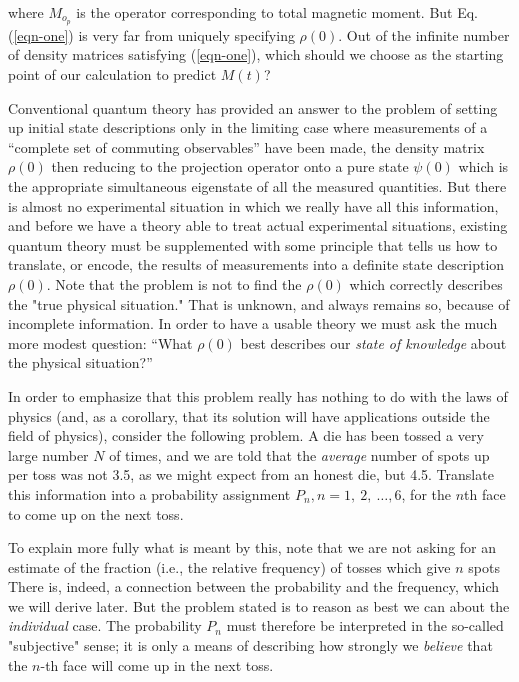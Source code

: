 \documentclass[]{article}
\begin{document}
where \(M_{o_p}\) is the operator corresponding to total magnetic moment. But Eq. (\ref{eqn-one}) is very far from uniquely
specifying \(\rho(0)\). Out of the infinite number of density matrices
satisfying (\ref{eqn-one}), which should we choose as the starting point of our
calculation to predict \(M(t)\)?

Conventional quantum theory has provided an answer to the problem of
setting up initial state descriptions only in the limiting case where
measurements of a ``complete set of commuting observables'' have been
made, the density matrix \(\rho(0)\) then reducing to the projection
operator onto a pure state \(\psi(0)\) which is the appropriate
simultaneous eigenstate of all the measured quantities. But there is
almost no experimental situation in which we really have all this
information, and before we have a theory able to treat actual
experimental situations, existing quantum theory must be supplemented
with some principle that tells us how to translate, or encode, the
results of measurements into a definite state description \(\rho(0)\).
Note that the problem is not to find the \(\rho(0)\) which correctly
describes the "true physical situation." That is unknown, and always
remains so, because of incomplete information. In order to have a usable
theory we must ask the much more modest question: ``What \(\rho(0)\) best
describes our \emph{state of knowledge} about the physical situation?''

In order to emphasize that this problem really has nothing to do with
the laws of physics (and, as a corollary, that its solution will have
applications outside the field of physics), consider the following
problem. A die has been tossed a very large number \(N\) of times, and
we are told that the \emph{average} number of spots up per toss was not
3.5, as we might expect from an honest die, but 4.5. Translate this
information into a probability assignment
\(P_{n},n = 1,\ 2,\ \ldots,6\), for the \(n\)th face to come up on the
next toss.

To explain more fully what is meant by this, note that we are not asking
for an estimate of the fraction (i.e., the relative frequency) of tosses
which give \(n\) spots There is, indeed, a connection between the
probability and the frequency, which we will derive later. But the
problem stated is to reason as best we can about the \emph{individual}
case. The probability \(P_{n}\) must therefore be interpreted in the
so-called "subjective" sense; it is only a means of describing how
strongly we \emph{believe} that the \(n\)-th face will come up in the
next toss.
\end{document}
